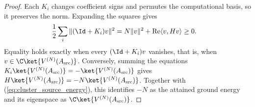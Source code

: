 \begin{proof}
    Each $K_i$ changes coefficient signs and permutes the computational basis,
    so it preserves the norm. Expanding the squares gives
    \begin{align}
        \frac12\sum_i\|(\Id+K_i)v\|^2
         & =N\|v\|^2+\operatorname{Re}\langle v,Hv\rangle\ge0.
        \label{eq:cluster_source_energy}
    \end{align}
    Equality holds exactly when every $(\Id+K_i)v$ vanishes, that is, when
    $v\in\C\ket{V^{(N)}(A_{\mathrm{src}})}$. Conversely, summing the equations
    $K_i\ket{V^{(N)}(A_{\mathrm{src}})}=-\ket{V^{(N)}(A_{\mathrm{src}})}$
    gives $H\ket{V^{(N)}(A_{\mathrm{src}})}=-N\ket{V^{(N)}(A_{\mathrm{src}})}$.
    Together with (\ref{eq:cluster_source_energy}), this identifies $-N$ as
    the attained ground energy and its eigenspace as
    $\C\ket{V^{(N)}(A_{\mathrm{src}})}$.
\end{proof}

